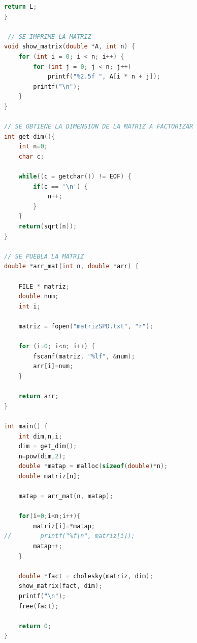 \documentclass[10pt, oneside,spanish]{article}
\begin{document}
\begin{enumerate}
\begin{lstlisting}[language=C]
    return L;
}
 
 // SE IMPRIME LA MATRIZ
void show_matrix(double *A, int n) {
    for (int i = 0; i < n; i++) {
        for (int j = 0; j < n; j++)
            printf("%2.5f ", A[i * n + j]);
        printf("\n");
    }
}

// SE OBTIENE LA DIMENSION DE LA MATRIZ A FACTORIZAR
int get_dim(){
    int n=0;
    char c;

    while((c = getchar()) != EOF) {
        if(c == '\n') {
            n++;
        }
    }
    return(sqrt(n));
}

// SE PUEBLA LA MATRIZ
double *arr_mat(int n, double *arr) {

    FILE * matriz;
    double num;
    int i;

    matriz = fopen("matrizSPD.txt", "r");
    
    for (i=0; i<n; i++) {
        fscanf(matriz, "%lf", &num);
        arr[i]=num;
    }

    return arr;
}
 
int main() {
    int dim,n,i;
    dim = get_dim();
    n=pow(dim,2);
    double *matap = malloc(sizeof(double)*n);
    double matriz[n];

    matap = arr_mat(n, matap);

    for(i=0;i<n;i++){
        matriz[i]=*matap;
//        printf("%f\n", matriz[i]);
        matap++;
    }

    double *fact = cholesky(matriz, dim);
    show_matrix(fact, dim);
    printf("\n");
    free(fact);

    return 0;
}
\end{lstlisting}
\end{enumerate}



\end{document}
